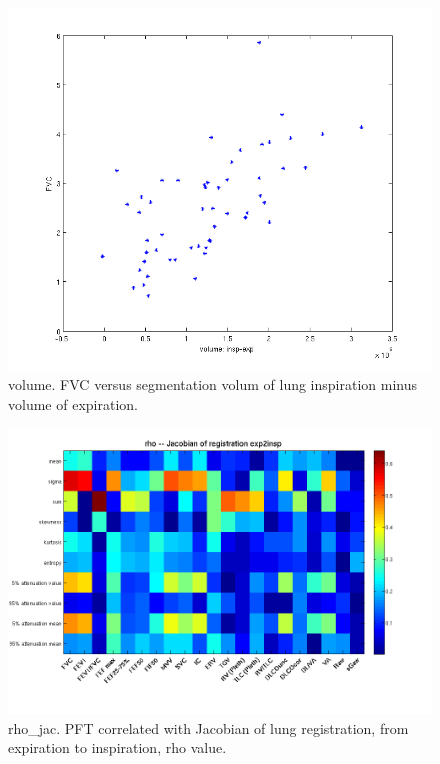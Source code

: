 \documentclass[12pt]{article}
\begin{document}
\begin{figure}
 \centering
 \includegraphics[width=0.8\linewidth,viewport=0 0 500 450]{volume.png}
 \caption{volume. FVC versus segmentation volum of lung inspiration minus volume of expiration.}
\end{figure}

\begin{figure}
 \includegraphics[width=0.9\linewidth,viewport=100 60 620 520]{rho_jac.png}
 \caption{rho\_jac. PFT correlated with Jacobian of lung registration, from expiration to inspiration, rho value.}
\end{figure}
\end{document}
